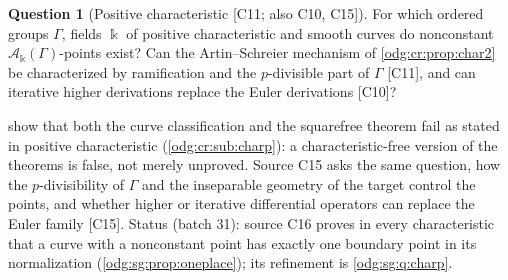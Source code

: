 \documentclass[11pt,oneside]{article}
\numberwithin{equation}{section}
\theoremstyle{definition}
\newtheorem{question}[question]{Question}
\theoremstyle{remark}
\newcommand{\src}[1]{\textup{\textsf{\small[#1]}}}
\newcommand{\crA}{\mathcal A_\Bbbk(\Gamma)}
\begin{document}
\begin{question}[Positive characteristic \src{C11; also C10, C15}]\label{odg:cr:q:charp}
For which ordered groups $\Gamma$, fields $\Bbbk$ of positive characteristic and smooth
curves do nonconstant $\crA$-points exist? Can the Artin--Schreier mechanism of
\cref{odg:cr:prop:char2} be characterized by ramification and the $p$-divisible part
of $\Gamma$ \src{C11}, and can iterative higher derivations replace the Euler
derivations \src{C10}?
\end{question}
 show that both the curve classification and
the squarefree theorem fail as stated in positive characteristic
(\cref{odg:cr:sub:charp}): a characteristic-free version of the theorems is false, not
merely unproved. Source C15 asks the same question, how the $p$-divisibility of
$\Gamma$ and the inseparable geometry of the target control the points, and whether
higher or iterative differential operators can replace the Euler family \src{C15}. Status (batch 31): source C16 proves in every characteristic that a curve with a
nonconstant point has exactly one boundary point in its normalization
(\cref{odg:sg:prop:oneplace}); its refinement is \cref{odg:sg:q:charp}.
\end{document}
